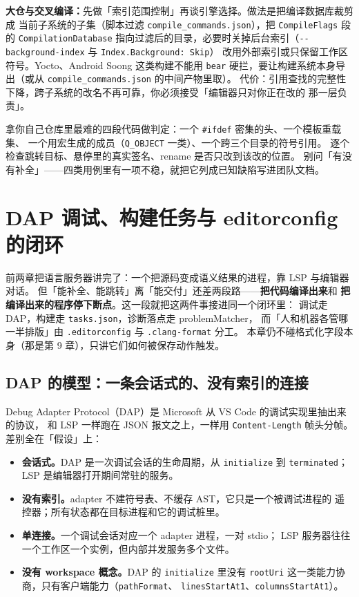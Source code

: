 \documentclass[12pt,a4paper,fontset=fandol]{ctexbook}
\newcommand{\Opt}[1]{\texttt{-\/-#1}}
\begin{document}
\textbf{大仓与交叉编译：}先做「索引范围控制」再谈引擎选择。做法是把编译数据库裁剪成
当前子系统的子集（脚本过滤 \texttt{compile\_commands.json}），把 \texttt{CompileFlags} 段的
\texttt{CompilationDatabase}
指向过滤后的目录，必要时关掉后台索引（\Opt{background-index} 与 \texttt{Index.Background: Skip}）
改用外部索引或只保留工作区符号。Yocto、Android Soong 这类构建不能用
\texttt{bear} 硬拦，要让构建系统本身导出（或从 \texttt{compile\_commands.json} 的中间产物里取）。
代价：引用查找的完整性下降，跨子系统的改名不再可靠，你必须接受「编辑器只对你正在改的
那一层负责」。

\begin{bestpractice}[title={用四类用例做选型}]
拿你自己仓库里最难的四段代码做判定：一个 \texttt{\#ifdef} 密集的头、一个模板重载集、
一个用宏生成的成员（\texttt{Q\_OBJECT} 一类）、一个跨三个目录的符号引用。
逐个检查跳转目标、悬停里的真实签名、rename 是否只改到该改的位置。
别问「有没有补全」——四类用例里有一项不稳，就把它列成已知缺陷写进团队文档。
\end{bestpractice}

\chapter{DAP 调试、构建任务与 editorconfig 的闭环}\label{ch:dap-and-build}

前两章把语言服务器讲完了：一个把源码变成语义结果的进程，靠 LSP 与编辑器对话。
但「能补全、能跳转」离「能交付」还差两段路——\textbf{把代码编译出来}和
\textbf{把编译出来的程序停下断点}。这一段就把这两件事接进同一个闭环里：
调试走 DAP，构建走 \texttt{tasks.json}，诊断落点走 problemMatcher，
而「人和机器各管哪一半排版」由 \texttt{.editorconfig} 与 \texttt{.clang-format} 分工。
本章仍不碰格式化字段本身（那是第 9 章），只讲它们如何被保存动作触发。

\section{DAP 的模型：一条会话式的、没有索引的连接}\label{sec:ch07-s1}

Debug Adapter Protocol（DAP）是 Microsoft 从 VS Code 的调试实现里抽出来的协议，
和 LSP 一样跑在 JSON 报文之上，一样用 \texttt{Content-Length} 帧头分帧。
差别全在「假设」上：

\begin{itemize}
  \item \textbf{会话式。}DAP 是一次调试会话的生命周期，从 \texttt{initialize} 到
        \texttt{terminated}；LSP 是编辑器打开期间常驻的服务。
  \item \textbf{没有索引。}adapter 不建符号表、不缓存 AST，它只是一个被调试进程的
        遥控器；所有状态都在目标进程和它的调试桩里。
  \item \textbf{单连接。}一个调试会话对应一个 adapter 进程，一对 stdio；
        LSP 服务器往往一个工作区一个实例，但内部并发服务多个文件。
  \item \textbf{没有 workspace 概念。}DAP 的 \texttt{initialize} 里没有
        \texttt{rootUri} 这一类能力协商，只有客户端能力（\texttt{pathFormat}、
        \texttt{linesStartAt1}、\texttt{columnsStartAt1}）。
\end{itemize}
\end{document}
